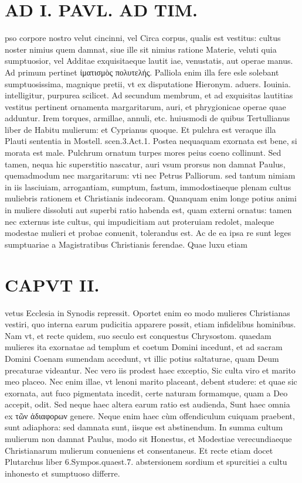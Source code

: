 \documentclass{article}
\begin{document}
\begin{pages}
\section*{AD I. PAVL. AD TIM. }
\marginpar{[ p.80 ]}\pstart pso corpore nostro velut cincinni, vel Circa corpus, qualis est vestitus: cultus noster nimius quem damnat, siue ille sit nimius ratione Materie, veluti quia sumptuosior, vel Additae exquisitaeque lautit iae, venustatis, aut operae manus. Ad primum pertinet ἰματισμὸς πολυτελής. Palliola enim illa fere esle solebant sumptuosissima, magnique pretii, vt ex disputatione Hieronym. aduers. Iouinia. intelligitur, purpurea scilicet. Ad secundum membrum, et ad exquisitas lautitias vestitus pertinent ornamenta margaritarum, auri, et phrygionicae operae quae adduntur. Irem torques, armillae, annuli, etc. huiusmodi de quibus Tertullianus liber  de Habitu mulierum: et Cyprianus quoque. Et pulchra est veraque illa Plauti sententia in Mostell. scen.3.Act.1.  \pend\pstart Postea nequaquam exornata est bene, si morata est male.  \pend\pstart Pulchrum ornatum turpes mores peius coeno collinunt.  \pend\pstart Sed tamen, nequa hic superstitio nascatur, auri vsum prorsus non damnat Paulus, quemadmodum nec margaritarum: vti nec Petrus Palliorum. sed tantum nimiam in iis lasciuiam, arrogantiam, sumptum, fastum, immodostiaeque plenam cultus muliebris rationem et Christianis indecoram. Quanquam enim longe potius animi in muliere dissoluti aut superbi ratio habenda est, quam externi ornatus: tamen nec externus iste cultus, qui impudicitiam aut proteruiam redolet, maleque modestae mulieri et probae conuenit, tolerandus est. Ac de ea ipsa re sunt leges sumptuariae a Magistratibus Christianis ferendae. Quae luxu etiam  \pend
\section*{CAPVT II. }
\marginpar{[ p.81 ]}\pstart vetus Ecclesia in Synodis repressit. Oportet enim eo modo mulieres Christianas vestiri, quo interna earum pudicitia apparere possit, etiam infidelibus hominibus. Nam vt, et recte quidem, suo seculo est conquestus Chrysostom. quaedam mulieres ita exornatae ad templum et coetum Domini incedunt, et ad sacram Domini Coenam sumendam accedunt, vt illic potius saltaturae, quam Deum precaturae videantur. Nec vero iis prodest haec exceptio, Sic culta viro et marito meo placeo. Nec enim illae, vt lenoni marito placeant, debent studere: et quae sic exornata, aut fuco pigmentata incedit, certe naturam formamque, quam a Deo accepit, odit. Sed neque haec altera earum ratio est audienda, Sunt haec omnia ex τῶν ἀδιαφορων genere. Neque  enim haec cùm offendiculum cuiquam praebent, sunt adiaphora: sed damnata sunt, iisque  est abstinendum. In summa cultum mulierum non damnat Paulus, modo sit Honestus, et Modestiae verecundiaeque Christianarum mulierum conueniens et consentaneus. Et recte etiam docet Plutarchus liber 6.Sympos.quaest.7. abstersionem sordium et spurcitiei a cultu inhonesto et sumptuoso differre.  \pend
{}
{}

\end{pages}
\end{document}

